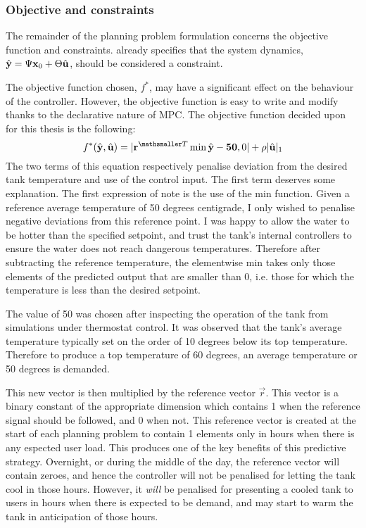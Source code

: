 \subsubsection{Objective and constraints}

The remainder of the planning problem formulation concerns the objective function and constraints.
 already specifies that the system dynamics, $\hat{\mathbf{y}} = \Psi \mathbf{x}_0 + \Theta \hat{\mathbf{u}}$, should be considered a constraint.

The objective function chosen, $f^*$, may have a significant effect on the behaviour of the controller.
However, the objective function is easy to write and modify thanks to the declarative nature of MPC.
The objective function decided upon for this thesis is the following:
\begin{equation}
	f^*(\hvec{y}, \hvec{u}) = |\vec{r}\transpose \min{\hvec{y} - \vec{50}, 0}| + \rho |\hvec{u}|_1
\end{equation}
The two terms of this equation respectively penalise deviation from the desired tank temperature and use of the control input.
The first term deserves some explanation.
The first expression of note is the use of the min function.
Given a reference average temperature of 50 degrees centigrade, I only wished to penalise negative deviations from this reference point.
I was happy to allow the water to be hotter than the specified setpoint, and trust the tank's internal controllers to ensure the water does not reach dangerous temperatures.
Therefore after subtracting the reference temperature, the elementwise min takes only those elements of the predicted output that are smaller than 0, i.e. those for which the temperature is less than the desired setpoint.

The value of 50 was chosen after inspecting the operation of the tank from simulations under thermostat control.
It was observed that the tank's average temperature typically set on the order of 10 degrees below its top temperature.
Therefore to produce a top temperature of 60 degrees, an average temperature or 50 degrees is demanded.

This new vector is then multiplied by the reference vector $\vec{r}$.
This vector is a binary constant of the appropriate dimension which contains 1 when the reference signal should be followed, and 0 when not.
This reference vector is created at the start of each planning problem to contain 1 elements only in hours when there is any espected user load.
This produces one of the key benefits of this predictive strategy.
Overnight, or during the middle of the day, the reference vector will contain zeroes, and hence the controller will not be penalised for letting the tank cool in those hours.
However, it \emph{will} be penalised for presenting a cooled tank to users in hours when there is expected to be demand, and may start to warm the tank in anticipation of those hours.

